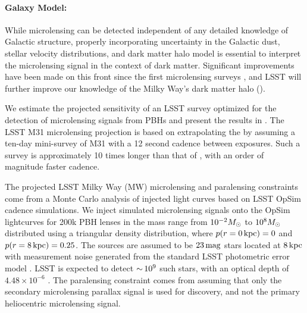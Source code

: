 \paragraph{Galaxy Model:} While microlensing can be detected independent of any detailed knowledge of Galactic structure, properly incorporating uncertainty in the Galactic dust, stellar velocity distributions, and dark matter halo model is essential to interpret the microlensing signal in the context of dark matter.
Significant improvements have been made on this front since the first microlensing surveys \citep[e.g.,][]{2018MNRAS.479.2889C}, and LSST will further improve our knowledge of the Milky Way's dark matter halo ().



We estimate the projected sensitivity of an LSST survey optimized for the detection of microlensing signals from PBHs and present the results in .
The LSST M31 microlensing projection is based on extrapolating the \citet{1701.02151} by assuming a ten-day mini-survey of M31 with a 12 second cadence between exposures.
Such a survey is approximately 10 times longer than that of \citet{1701.02151}, with an order of magnitude faster cadence.

The projected LSST Milky Way (MW) microlensing and paralensing constraints come from a Monte Carlo analysis of injected light curves based on LSST OpSim cadence simulations.
We inject simulated microlensing signals onto the OpSim lightcurves for 200k PBH lenses in the mass range from $10^{-2}M_\odot$ to $10^{8}M_\odot$ distributed using a triangular density distribution, where $p(r = 0 \mathrm{\,kpc}) = 0$ and $p(r = 8\mathrm{\,kpc}) = 0.25$.
The sources are assumed to be $23\mathrm{\,mag}$ stars located at $8\mathrm{\,kpc}$ with measurement noise generated from the standard LSST photometric error model \citep{0805.2366}.
LSST is expected to detect $ {\sim}\, 10^{9}$ such stars, with an optical depth of $4.48 \times 10^{-6}$ \citep{2006ApJ...636..240S}.
The paralensing constraint comes from assuming that only the secondary microlensing parallax signal is used for discovery, and not the primary heliocentric microlensing signal.


